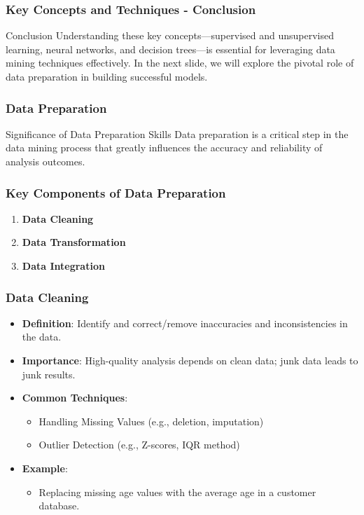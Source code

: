\documentclass{beamer}
\begin{document}
\begin{frame}[fragile]
    \frametitle{Key Concepts and Techniques - Conclusion}
    \begin{block}{Conclusion}
        Understanding these key concepts—supervised and unsupervised learning, neural networks, and decision trees—is essential for leveraging data mining techniques effectively. In the next slide, we will explore the pivotal role of data preparation in building successful models.
    \end{block}
\end{frame}

\begin{frame}[fragile]
    \frametitle{Data Preparation}
    
    \begin{block}{Significance of Data Preparation Skills}
        Data preparation is a critical step in the data mining process that greatly influences the accuracy and reliability of analysis outcomes. 
    \end{block}
\end{frame}

\begin{frame}[fragile]
    \frametitle{Key Components of Data Preparation}
    \begin{enumerate}
        \item \textbf{Data Cleaning}
        \item \textbf{Data Transformation}
        \item \textbf{Data Integration}
    \end{enumerate}
\end{frame}

\begin{frame}[fragile]
    \frametitle{Data Cleaning}
    
    \begin{itemize}
        \item \textbf{Definition}: Identify and correct/remove inaccuracies and inconsistencies in the data.
        \item \textbf{Importance}: High-quality analysis depends on clean data; junk data leads to junk results.
        \item \textbf{Common Techniques}:
        \begin{itemize}
            \item Handling Missing Values (e.g., deletion, imputation)
            \item Outlier Detection (e.g., Z-scores, IQR method)
        \end{itemize}
        \item \textbf{Example}:
        \begin{itemize}
            \item Replacing missing age values with the average age in a customer database.
        \end{itemize}
    \end{itemize}
\end{frame}
\end{document}

